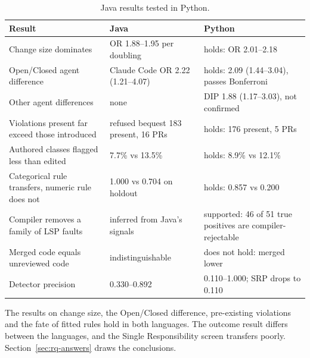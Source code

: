 \begin{table}[htb]
\centering
\caption{Java results tested in Python.}
\label{tab:cross-language}
\begin{tabular}{@{}L{4.2cm}L{4.4cm}L{4.4cm}@{}}
\toprule
\textbf{Result} & \textbf{Java} & \textbf{Python} \\
\midrule
Change size dominates & OR 1.88--1.95 per doubling & holds: OR 2.01--2.18 \\
Open/Closed agent difference & Claude Code OR 2.22 (1.21--4.07) & holds: 2.09 (1.44--3.04),
passes Bonferroni \\
Other agent differences & none & DIP 1.88 (1.17--3.03), not confirmed \\
Violations present far exceed those introduced & refused bequest 183 present, 16 PRs & holds: 176
present, 5 PRs \\
Authored classes flagged less than edited & 7.7\% vs 13.5\% & holds: 8.9\% vs 12.1\% \\
Categorical rule transfers, numeric rule does not & 1.000 vs 0.704 on holdout & holds: 0.857 vs
0.200 \\
Compiler removes a family of LSP faults & inferred from Java's signals & supported: 46 of 51 true
positives are compiler-rejectable \\
Merged code equals unreviewed code & indistinguishable & does not hold: merged lower \\
Detector precision & 0.330--0.892 & 0.110--1.000; SRP drops to 0.110 \\
\bottomrule
\end{tabular}
\end{table}

The results on change size, the Open/Closed difference, pre-existing violations and the fate of
fitted rules hold in both languages. The outcome result differs between the languages, and the Single
Responsibility screen transfers poorly. Section~\ref{sec:rq-answers} draws the conclusions.

